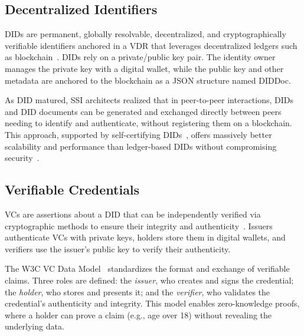 \subsection{Decentralized Identifiers}
\label{subsec:dids}

\acp{DID} are permanent, globally resolvable, decentralized, and cryptographically verifiable identifiers anchored in a \ac{VDR} that leverages decentralized ledgers such as blockchain~\cite{sedlmeir:smethurst:rieger:etal:2021}.
\acp{DID} rely on a private/public key pair.
The identity owner manages the private key with a digital wallet, while the public key and other metadata are anchored to the blockchain as a JSON structure named DIDDoc.

As \ac{DID} matured, \ac{SSI} architects realized that in peer-to-peer interactions, \acp{DID} and DID documents can be generated and exchanged directly between peers needing to identify and authenticate, without registering them on a blockchain.
This approach, supported by self-certifying \acp{DID}~\cite{preukschat:reed:2021}, offers massively better scalability and performance than ledger-based \acp{DID} without compromising security~\cite{windley:2021}.

\subsection{Verifiable Credentials}
\label{subsec:vcs}

\acp{VC} are assertions about a \ac{DID} that can be independently verified via cryptographic methods to ensure their integrity and authenticity~\cite{soltani:nguyen:an:2021}.
Issuers authenticate \acp{VC} with private keys, holders store them in digital wallets, and verifiers use the issuer's public key to verify their authenticity.

The \ac{W3C} \ac{VC} Data Model~\cite{sporny:longley:chadwick:2019} standardizes the format and exchange of verifiable claims.
Three roles are defined: the \emph{issuer}, who creates and signs the credential; the \emph{holder}, who stores and presents it; and the \emph{verifier}, who validates the credential's authenticity and integrity.
This model enables zero-knowledge proofs, where a holder can prove a claim (e.g., age over 18) without revealing the underlying data.

